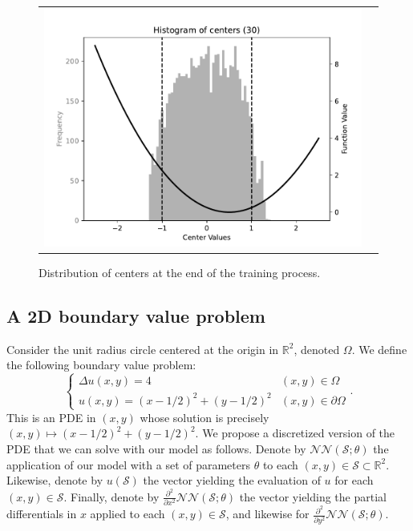 \documentclass[12pt]{report} %
\begin{document}
\begin{figure}
\begin{tabular}{cc}
    \includegraphics[width=.6\textwidth, clip=true,trim={.5cm 0 .5cm 0}]{imagenes/experiments/1d/ode/histogram-centers-C30.pdf}
  \end{tabular}
  \caption{Distribution of centers at the end of the training process.}
  \label{fig:ode-1d-distribution-of-centers}
\end{figure}

\clearpage

\subsection*{A 2D boundary value problem}

Consider the unit radius circle centered at the origin in $\mathbb{R}^2$,
denoted $\Omega$. We define the following boundary value problem:
\begin{equation}
  \left\{\begin{array}{ll}
    \Delta u (x, y) = 4                      & (x, y) \in \Omega          \\
    u (x, y) = (x - 1 / 2)^2 + (y - 1 / 2)^2 & (x, y) \in \partial \Omega
  \end{array}\right. . \label{eqn:bvp-2d}
\end{equation}
This is an PDE in $(x, y)$ whose solution is precisely $(x, y) \mapsto (x - 1
  / 2)^2 + (y - 1 / 2)^2$. We propose a discretized version of the PDE that we
can solve with our model as follows. Denote by $\mathcal{N}\mathcal{N}
  (\mathcal{S}; \theta)$ the application of our model with a set of parameters
$\theta$ to each $(x, y) \in \mathcal{S} \subset \mathbb{R}^2$. Likewise,
denote by $u (\mathcal{S})$ the vector yielding the evaluation of $u$ for each
$(x, y) \in \mathcal{S}$. Finally, denote by $\frac{\partial^2}{\partial x^2}
  \mathcal{N}\mathcal{N} (\mathcal{S}; \theta)$ the vector yielding the partial
differentials in $x$ applied to each $(x, y) \in \mathcal{S}$, and likewise
for $\frac{\partial^2}{\partial y^2} \mathcal{N}\mathcal{N} (\mathcal{S};
  \theta)$.
\end{document}
